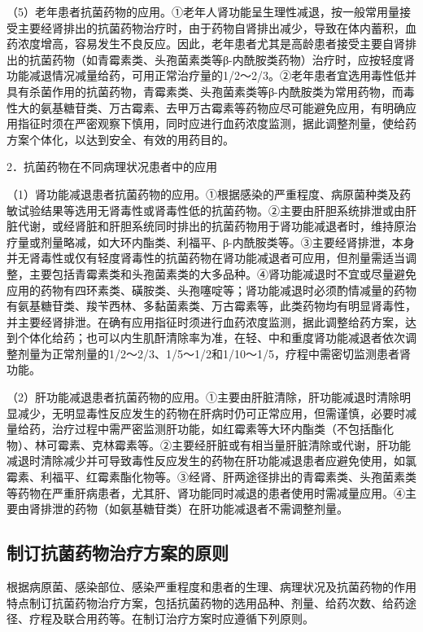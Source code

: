 （5）老年患者抗菌药物的应用。①老年人肾功能呈生理性减退，按一般常用量接受主要经肾排出的抗菌药物治疗时，由于药物自肾排出减少，导致在体内蓄积，血药浓度增高，容易发生不良反应。因此，老年患者尤其是高龄患者接受主要自肾排出的抗菌药物（如青霉素类、头孢菌素类等β-内酰胺类药物）治疗时，应按轻度肾功能减退情况减量给药，可用正常治疗量的1/2～2/3。②老年患者宜选用毒性低并具有杀菌作用的抗菌药物，青霉素类、头孢菌素类等β-内酰胺类为常用药物，而毒性大的氨基糖苷类、万古霉素、去甲万古霉素等药物应尽可能避免应用，有明确应用指征时须在严密观察下慎用，同时应进行血药浓度监测，据此调整剂量，使给药方案个体化，以达到安全、有效的用药目的。

2．抗菌药物在不同病理状况患者中的应用

（1）肾功能减退患者抗菌药物的应用。①根据感染的严重程度、病原菌种类及药敏试验结果等选用无肾毒性或肾毒性低的抗菌药物。②主要由肝胆系统排泄或由肝脏代谢，或经肾脏和肝胆系统同时排出的抗菌药物用于肾功能减退者时，维持原治疗量或剂量略减，如大环内酯类、利福平、β-内酰胺类等。③主要经肾排泄，本身并无肾毒性或仅有轻度肾毒性的抗菌药物在肾功能减退者可应用，但剂量需适当调整，主要包括青霉素类和头孢菌素类的大多品种。④肾功能减退时不宜或尽量避免应用的药物有四环素类、磺胺类、头孢噻啶等；肾功能减退时必须酌情减量的药物有氨基糖苷类、羧苄西林、多黏菌素类、万古霉素等，此类药物均有明显肾毒性，并主要经肾排泄。在确有应用指征时须进行血药浓度监测，据此调整给药方案，达到个体化给药；也可以内生肌酐清除率为准，在轻、中和重度肾功能减退者依次调整剂量为正常剂量的1/2～2/3、1/5～1/2和1/10～1/5，疗程中需密切监测患者肾功能。

（2）肝功能减退患者抗菌药物的应用。①主要由肝脏清除，肝功能减退时清除明显减少，无明显毒性反应发生的药物在肝病时仍可正常应用，但需谨慎，必要时减量给药，治疗过程中需严密监测肝功能，如红霉素等大环内酯类（不包括酯化物）、林可霉素、克林霉素等。②主要经肝脏或有相当量肝脏清除或代谢，肝功能减退时清除减少并可导致毒性反应发生的药物在肝功能减退患者应避免使用，如氯霉素、利福平、红霉素酯化物等。③经肾、肝两途径排出的青霉素类、头孢菌素类等药物在严重肝病患者，尤其肝、肾功能同时减退的患者使用时需减量应用。④主要由肾排泄的药物（如氨基糖苷类）在肝功能减退者不需调整剂量。

\subsection{制订抗菌药物治疗方案的原则}

根据病原菌、感染部位、感染严重程度和患者的生理、病理状况及抗菌药物的作用特点制订抗菌药物治疗方案，包括抗菌药物的选用品种、剂量、给药次数、给药途径、疗程及联合用药等。在制订治疗方案时应遵循下列原则。

